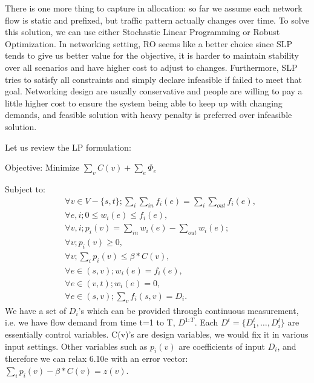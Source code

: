 \documentclass[twoside,leqno, 11pt]{article}
\begin{document}
There is one more thing to capture in allocation: so far we assume each network flow is static and prefixed, but traffic pattern actually changes over time. To solve this solution, we can use either Stochastic Linear Programming or Robust Optimization. In networking setting, RO seems like a better choice since SLP tends to give us better value for the objective, it is harder to maintain stability over all scenarios and have higher cost to adjust to changes. Furthermore, SLP tries to satisfy all constraints and simply declare infeasible if failed to meet that goal. Networking design are usually conservative and people are willing to pay a little higher cost to ensure the system being able to keep up with changing demands, and feasible solution with heavy penalty is preferred over infeasible solution.

Let us review the LP formulation:
 
Objective: Minimize $\sum\limits_v C(v)+ \sum\limits_e \Phi_e$

Subject to:
\begin{subequations}
\begin{align}
&\forall v \in V-\{s, t\}; \sum\limits_i \sum\limits_{in}  f_i(e)= \sum\limits_i  \sum\limits_{out} f_i(e),\\
&\forall e, i; 0 \leq w_i(e) \leq f_i(e),\\
&\forall v, i; p_i(v) =  \sum\limits_{in } w_i(e) -  \sum\limits_{out} w_i(e) ;\\
&\forall v; p_i(v)\geq 0 ,\\
&\forall v; \sum\limits_i p_i(v)\leq \beta*C(v),\\
&\forall e\in(s, v) ; w_i(e) =f_i(e),\\
&\forall e\in(v, t) ; w_i(e) =0,\\
&\forall e\in(s, v) ; \sum\limits_v f_i(s,v) =D_i.
\end{align}
\end{subequations}
We have a set of $D_i$'s which can be provided through continuous measurement, i.e. we have flow demand from time t=1 to T, $D^{1:T}$. Each $D^{t} = \{D_1^t, \dots, D_i^t\}$ are essentially control variables. C(v)'s are design variables, we would fix it in various input settings. Other variables such as $p_i(v)$ are coefficients of input $D_i$, and therefore we can relax 6.10e with an error vector: $\sum\limits_i p_i(v)- \beta*C(v) =z(v)$. 
\end{document}
